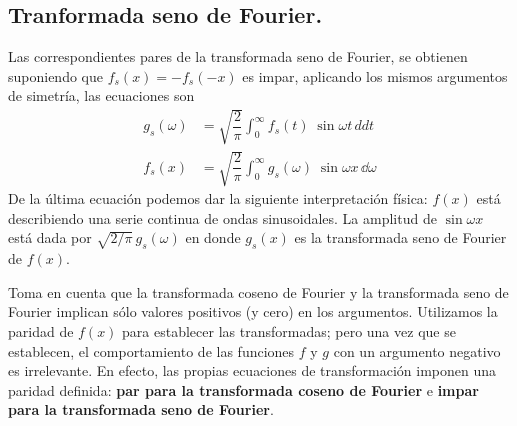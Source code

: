 \subsection{Tranformada seno de Fourier.}
Las correspondientes pares de la transformada seno de Fourier, se obtienen suponiendo que $f_{s}(x) = - f_{s}(-x)$ es impar, aplicando los mismos argumentos de simetría, las ecuaciones son
\begin{align}
g_{s} (\omega) &=  \sqrt{\dfrac{2}{\pi}} \int_{0}^{\infty} f_{s} (t) \; \sin \omega t \, dd t \label{eq:ecuacion_15_26} \\
f_{s} (x) &= \sqrt{\dfrac{2}{\pi}} \int_{0}^{\infty} g_{s} (\omega) \; \sin \omega x \, \dd \omega  \label{eq:ecuacion_15_27}
\end{align}
De la última ecuación podemos dar la siguiente interpretación física: $f(x)$ está describiendo una serie continua de ondas sinusoidales. La amplitud de $\sin \omega x$ está dada por $\sqrt{2 / \pi} \, g_{s} (\omega)$ en donde $g_{s}(x)$ es la transformada seno de Fourier de $f(x)$.
\par
Toma en cuenta que la transformada coseno de Fourier y la transformada seno de Fourier implican sólo valores positivos (y cero) en los argumentos. Utilizamos la paridad de $f (x)$ para establecer las transformadas; pero una vez que se establecen, el comportamiento de las funciones $f$ y $g$ con un argumento negativo es irrelevante. En efecto, las propias ecuaciones de transformación imponen una paridad definida: \textbf{par para la transformada coseno de Fourier} e \textbf{impar para la transformada seno de Fourier}.
